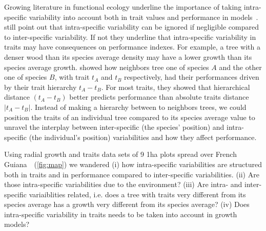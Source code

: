 Growing literature in functional ecology underline the importance of taking intra-specific variability into account both in trait values and performance in models~\citep{violle_towards_2009, clark_high-dimensional_2010, albert_when_2011, violle_return_2012}.~\citet{albert_when_2011} still point out that intra-specific variability can be ignored if negligible compared to inter-specific variability. If not they underline that intra-specific variability in traits may have consequences on performance indexes. For example, a tree with a denser wood than its species average density may have a lower growth than its species average growth. \citet{kunstler_competitive_2012} showed how neighbors tree one of species $A$ and the other one of species $B$, with trait $t_A$ and $t_B$ respectively, had their performances driven by their trait hierarchy $t_A - t_B$. For most traits, they showed that hierarchical distance $(t_A - t_B)$ better predicts performance than absolute traits distance $\vert t_A - t_B \vert$. Instead of making a hierarchy between to neighbors trees, we could position the traits of an individual tree compared to its species average value to unravel the interplay between inter-specific (the species' position) and intra-specific (the individual's position) variabilities and how they affect performance.

Using radial growth and traits data sets of 9 1ha plots spread over French Guiana~\citep{baraloto_decoupled_2010}~(\autoref{fig:map}) we wandered (i) how intra-specific variabilities are structured both in traits and in performance compared to inter-specific variabilities. (ii) Are those intra-specific variabilities due to the environment? (iii) Are intra- and inter- specific variaiblities related, i.e. does a tree with traits very different from its species average has a growth very different from its species average? (iv) Does intra-specific variability in traits needs to be taken into account in growth models?